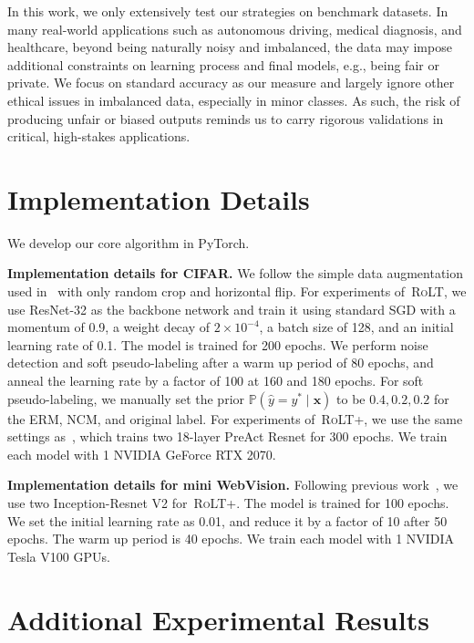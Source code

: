 \documentclass{article}
\def\x{{\boldsymbol x}}
\def\algo{{\textsc{RoLT}}}
\begin{document}
In this work, we only extensively test our strategies on benchmark datasets. In many
real-world applications such as autonomous driving, medical diagnosis, and healthcare, beyond
being naturally noisy and imbalanced, the data may impose additional constraints on learning process and final
models, e.g., being fair or private. We focus on standard accuracy as our measure and largely ignore
other ethical issues in imbalanced data, especially in minor classes. As such, the risk of producing
unfair or biased outputs reminds us to carry rigorous validations in critical, high-stakes applications.




\newpage
\appendix

\section{Implementation Details}
We develop our core algorithm in PyTorch.

\textbf{Implementation details for CIFAR.} We follow the simple data augmentation used in~\cite{he2016deep} with only random crop and horizontal flip. For experiments of~\algo, we use ResNet-32 as the backbone network and train it using standard SGD with a momentum of 0.9, a weight decay of $2 \times 10^{-4}$, a batch size of 128, and an initial learning rate of 0.1. The model is trained for 200 epochs. We perform noise detection and soft pseudo-labeling after a warm up period of 80 epochs, and anneal the learning rate by a factor of 100 at 160 and 180 epochs. For soft pseudo-labeling, we manually set the prior $\mathbb{P}(\hat{y} = y^{*} \mid \x)$ to be $0.4, 0.2, 0.2$ for the ERM, NCM, and original label. For experiments of~\algo+, we use the same settings as~\cite{li2020dividemix}, which trains two 18-layer PreAct Resnet for 300 epochs. We train each model with 1 NVIDIA GeForce RTX 2070.


\textbf{Implementation details for mini WebVision.} Following previous work~\cite{li2020dividemix}, we use two Inception-Resnet V2 for~\algo+. The model is trained for 100 epochs. We set the initial learning rate as 0.01, and reduce it by a factor of 10 after 50 epochs. The warm up period is 40 epochs. We train each model with 1 NVIDIA Tesla V100 GPUs.

\section{Additional Experimental Results}
\end{document}
